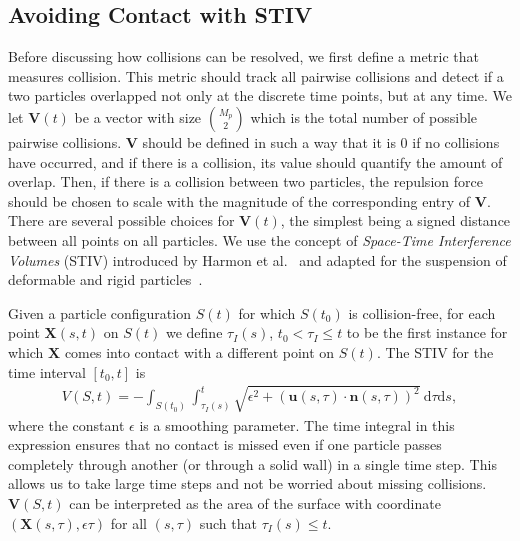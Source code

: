 \documentclass[preprint, 10pt]{elsarticle}
\begin{document}
\subsection{Avoiding Contact with STIV}
Before discussing how collisions can be resolved, we first define a
metric that measures collision.  This metric should track all pairwise
collisions and detect if a two particles overlapped not only at the
discrete time points, but at any time.  We let $\mathbf{V}(t)$ be a
vector with size $\binom{M_p}{2}$ which is the total number of possible
pairwise collisions.  $\mathbf{V}$ should be defined in such a way that
it is 0 if no collisions have occurred, and if there is a collision, its
value should quantify the amount of overlap.   Then, if there is a
collision between two particles, the repulsion force should be chosen to
scale with the magnitude of the corresponding entry of $\mathbf{V}$.
There are several possible choices for $\mathbf{V}(t)$, the simplest
being a signed distance between all points on all particles. We use the
concept of {\em Space-Time Interference Volumes} (STIV) introduced by
Harmon et al.~\cite{Harmon2011} and adapted for the suspension of
deformable and rigid particles~\cite{Lu2017}. 

Given a particle configuration $S(t)$ for which $S(t_0)$ is
collision-free, for each point $\mathbf{X}(s,t)$ on $S(t)$ we define
$\tau_I(s)$, $t_0 < \tau_I \leq t$ to be the first instance for which
$\mathbf{X}$ comes into contact with a different point on $S(t)$. The
STIV for the time interval $[t_0, t]$ is 
\begin{align*}
    V(S, t) = -\int_{S(t_0)}\int_{\tau_I(s)}^t 
    \sqrt{\epsilon^2 + (\mathbf{u}(s, \tau) \cdot
    \mathbf{n}(s,\tau))^2}~\text{d}\tau\text{d}s,
\end{align*}
where the constant $\epsilon$ is a smoothing parameter. The time
integral in this expression ensures that no contact is missed even if
one particle passes completely through another (or through a solid wall)
in a single time step. This allows us to take large time steps and not
be worried about missing collisions. $\mathbf{V}(S,t)$ can be
interpreted as the area of the surface with coordinate
$(\mathbf{X}(s,\tau),\epsilon\tau)$ for all $(s,\tau)$ such that
$\tau_I(s)\leq t$. 
\end{document}

